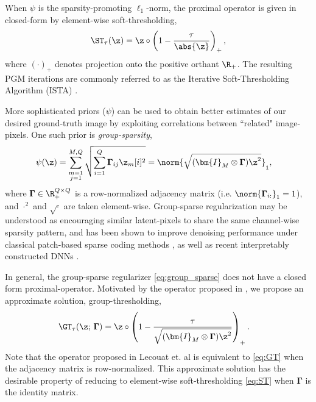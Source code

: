 \documentclass[lettersize,journal]{IEEEtran}
\newcommand{\ADJMAT}{\boldsymbol{\Gamma}}
\newcommand{\IDMAT}{\bm{I}}
\begin{document}
When $\psi$ is the sparsity-promoting $\ell_1$-norm, the proximal operator is
given in closed-form by element-wise soft-thresholding,
\begin{equation} \label{eq:ST}
\ST_\tau(\z) = \z \circ \left(1 - \frac{\tau}{\abs{\z}}\right)_+,
\end{equation}
where $(\cdot)_+$ denotes projection onto the positive orthant $\R_+$. 
The resulting PGM iterations are commonly referred
to as the Iterative Soft-Thresholding Algorithm (ISTA) \cite{Beck2009}.

More sophisticated priors ($\psi$) can be used to
obtain better estimates of our desired ground-truth image by exploiting
correlations between ``related" image-pixels. One such prior is
{\it group-sparsity}, 
\begin{align} \label{eq:group_sparse}
    \psi(\z) &= \sum_{\substack{m=1 \\j=1}}^{M, Q}
    \sqrt{\sum_{i=1}^Q \ADJMAT_{ij} \z_m[i]^2} = \norm{ \sqrt{(\IDMAT_M \otimes \ADJMAT) \z^2} }_1, 
\end{align}
where $\ADJMAT \in \R_+^{Q\times Q}$ is a row-normalized adjacency matrix (i.e.
$\norm{\ADJMAT_{i:}}_1 = 1$), and $\cdot^2$ and $\sqrt{\cdot}$ are taken element-wise.
Group-sparse regularization may be understood as
encouraging similar latent-pixels to share the same channel-wise sparsity pattern, and has
been shown to improve denoising performance under classical patch-based sparse coding
methods \cite{mairal2009non}, as well as recent interpretably constructed DNNs
\cite{lecouat2020nonlocal}.

In general, the group-sparse
regularizer \eqref{eq:group_sparse} does not have a closed form proximal-operator. 
Motivated by the operator proposed in
\cite{lecouat2020nonlocal}, we propose an approximate solution,
group-thresholding,
\begin{align} \label{eq:GT}
        \GT_{\tau}(\z; \, \ADJMAT) &= \z \circ \left( 1 - \frac{\tau}
            {\sqrt{(\IDMAT_M \otimes \ADJMAT)\z^2}} \right)_+.
\end{align}
Note that the operator proposed in Lecouat et. al \cite{lecouat2020nonlocal}
is equivalent to \eqref{eq:GT} when the adjacency matrix is row-normalized. This
approximate solution has the desirable property of reducing to element-wise
soft-thresholding \eqref{eq:ST} when $\ADJMAT$ is the identity matrix. 
\end{document}
